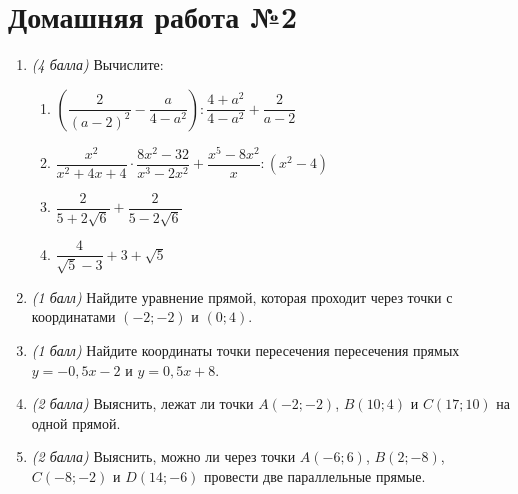 \documentclass[12pt, a4paper]{article}
\begin{document}
	
	\section*{Домашняя работа №2}
	\begin{enumerate}
		\item \textit{(4 балла)} Вычислите:
			\begin{enumerate}[label=\asbuk*)]
				\item $\left( \dfrac{2}{(a-2)^2}-\dfrac{a}{4-a^2}\right):\dfrac{4+a^2}{4-a^2}+\dfrac{2}{a-2}$
				\item $\dfrac{x^2}{x^2+4x+4}\cdot\dfrac{8x^2-32}{x^3-2x^2}+\dfrac{x^5-8x^2}{x}:(x^2-4)$
				\item $\dfrac{2}{5+2\sqrt{6}}+\dfrac{2}{5-2\sqrt{6}}$
				\item $\dfrac{4}{\sqrt{5}-3}+3+\sqrt{5}$
		\end{enumerate}
		\item \textit{(1 балл)} Найдите уравнение прямой, которая проходит через точки с координатами $(-2;-2)$ и $(0;4)$.
		\item \textit{(1 балл)} Найдите координаты точки пересечения пересечения прямых $y=-0,5x-2$ и $y=0,5x+8$.
		\item \textit{(2 балла)} Выяснить, лежат ли точки $A(-2;-2)$, $B(10;4)$ и $C(17;10)$ на одной прямой.
		\item \textit{(2 балла)} Выяснить, можно ли через точки $A(-6;6)$, $B(2;-8)$, $C(-8;-2)$ и $D(14;-6)$ провести две параллельные прямые.
	\end{enumerate}
\end{document}
